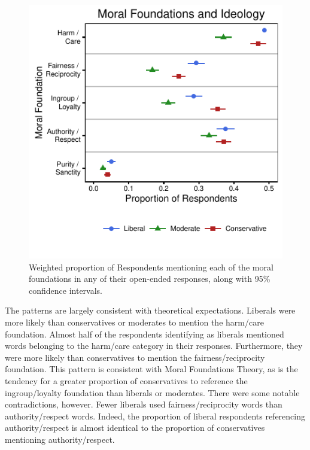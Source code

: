 \documentclass[12pt]{article}
\begin{document}
\begin{figure}[h]\centering
\includegraphics{../calc/fig/prop_ideol.pdf}
\caption{Weighted proportion of Respondents mentioning each of the moral foundations in any of their open-ended responses, along with 95\% confidence intervals.}\label{fig:prop_ideol}
\end{figure}

The patterns are largely consistent with theoretical expectations. Liberals were more likely than conservatives or moderates to mention the harm/care foundation. Almost half of the respondents identifying as liberals mentioned words belonging to the harm/care category in their responses. Furthermore, they were more likely than conservatives to mention the fairness/reciprocity foundation. This pattern is consistent with Moral Foundations Theory, as is the tendency for a greater proportion of conservatives to reference the ingroup/loyalty foundation than liberals or moderates. There were some notable contradictions, however. Fewer liberals used fairness/reciprocity words than authority/respect words. Indeed, the proportion of liberal respondents referencing authority/respect is almost identical to the proportion of conservatives mentioning authority/respect.
\end{document}
